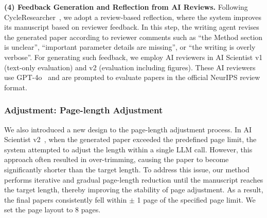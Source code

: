 \textbf{(4) Feedback Generation and Reflection from AI Reviews.}
Following CycleResearcher~\citep{weng2024cycleresearcher}, we adopt a review-based reflection, where the system improves its manuscript based on reviewer feedback.
In this step, the writing agent revises the generated paper according to reviewer comments such as ``the Method section is unclear'', ``important parameter details are missing'', or ``the writing is overly verbose''.
For generating such feedback, we employ  AI reviewers in AI Scientist v1 (text-only evaluation) and v2 (evaluation including figures).
These AI reviewers use GPT-4o~\citep{gpt4o} and are prompted to evaluate papers in the official NeurIPS review format.


\subsubsection{Adjustment: Page-length Adjustment}
We also introduced a new design to the page-length adjustment process. In AI Scientist v2~\citep{yamada2025ai}, when the generated paper exceeded the predefined page limit, the system attempted to adjust the length within a single LLM call. However, this approach often resulted in over-trimming, causing the paper to become significantly shorter than the target length. To address this issue, our method performs iterative and gradual page-length reduction until the manuscript reaches the target length, thereby improving the stability of page adjustment.
As a result, the final papers consistently fell within $\pm$ 1 page of the specified page limit.
We set the page layout to 8 pages.